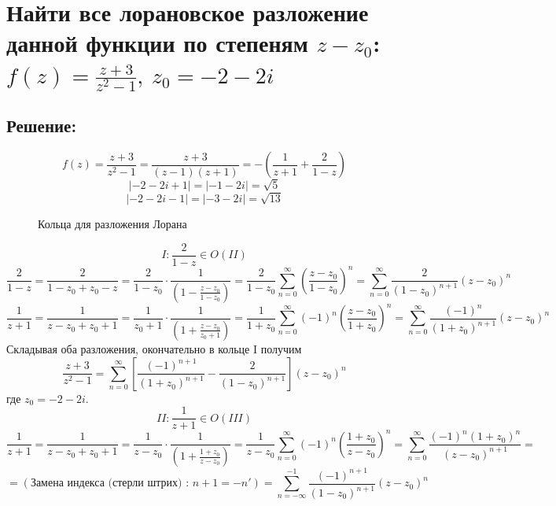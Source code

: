 \documentclass{article}
\begin{document}
	\section{Найти все лорановское разложение данной функции по степеням $z - z_0$: $f(z) = \frac{z+3}{z^2 - 1},\  z_0 = -2 -2i $}
	\subsection{Решение:}
	\[f(z) = \frac{z+3}{z^2 -1} = \frac{z+3}{(z-1)(z+1)} = - \left( \frac{1}{z+1} + \frac{2}{1-z} \right)\]
	\[|-2-2i+1| = |-1 -2i| = \sqrt{5}\]
	\[|-2-2i-1| = |-3 -2i| = \sqrt{13}\]
	\begin{figure}[h]
		\centering
		\caption{Кольца для разложения Лорана}
	\end{figure}
	\[I: \frac{2}{1-z} \in O(II)\]
	\[\frac{2}{1-z} = \frac{2}{1-z_0+z_0-z} = \frac{2}{1-z_0 } \cdot\frac{1}{\left(1 - \frac{z-z_0 }{1-z_0 }\right)} = \frac{2}{1-z_0} \sum\limits_{n=0}^{\infty} \left(\frac{z-z_0}{1-z_0}\right)^n =\sum\limits_{n=0}^{\infty} \frac{2}{(1-z_0)^{n+1}} (z-z_0)^n\]
	\[\frac{1}{z+1} = \frac{1}{z - z_0 + z_0 + 1} = \frac{1}{z_0 +1} \cdot \frac{1}{\left(1 + \frac{z-z_0}{z_0+1}\right)} = \frac{1}{1+z_0} \sum\limits_{n=0}^\infty(-1)^n\left(\frac{z-z_0}{1+z_0}\right)^n = \sum\limits_{n=0}^\infty\frac{(-1)^n}{(1+z_0)^{n+1}}(z-z_0)^n\]
	Складывая оба разложения, окончательно в кольце I получим
	\[\frac{z+3}{z^2-1} = \sum\limits_{n=0}^\infty \left[\frac{(-1)^{n+1}}{(1+z_0)^{n+1}} - \frac{2}{(1-z_0)^{n+1}}\right](z-z_0)^n\]
	где $z_0 = -2-2i$.
	\[II: \frac{1}{z+1} \in O(III)\]
	\[\frac{1}{z+1} = \frac{1}{z-z_0 + z_0 +1} = \frac{1}{z-z_0}\cdot \frac{1}{\left(1+\frac{1+z_0}{z-z_0}\right)} = \frac{1}{z-z_0}\sum\limits_{n=0}^\infty (-1)^n \left(\frac{1+z_0}{z-z_0}\right)^n = \sum\limits_{n=0}^\infty  \frac{(-1)^n(1+z_0)^n}{(z-z_0)^{n+1}} =\]
	\[= \left(\text{Замена индекса (стерли штрих) : } n+1=-n'\right) = \sum\limits_{n=-\infty}^{-1} \frac{(-1)^{n+1}}{(1-z_0)^{n+1}}(z-z_0)^n\]
	
\end{document}
